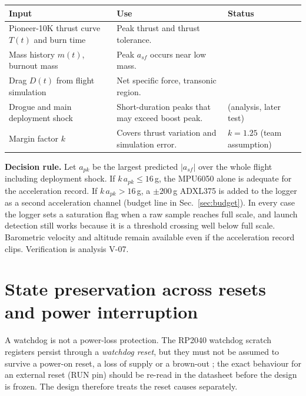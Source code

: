 \small
{}
\begin{tabularx}{\linewidth}{@{}L{42mm}Y L{34mm}@{}}
\toprule{}\textbf{Input}&\textbf{Use}&\textbf{Status}\\\midrule
Pioneer-10K thrust curve $T(t)$ and burn time & Peak thrust and thrust tolerance. & \\
Mass history $m(t)$, burnout mass & Peak $a_{sf}$ occurs near low mass. & \\
Drag $D(t)$ from flight simulation & Net specific force, transonic region. & \\
Drogue and main deployment shock & Short-duration peaks that may exceed boost peak. &  (analysis, later test)\\
Margin factor $k$ & Covers thrust variation and simulation error. & $k=1.25$ (team assumption)\\
\bottomrule
\end{tabularx}
\normalsize

\textbf{Decision rule.} Let $a_{pk}$ be the largest predicted $|a_{sf}|$ over the whole flight including deployment shock. If $k\,a_{pk}\le16$\,g, the MPU6050 alone is adequate for the acceleration record. If $k\,a_{pk}>16$\,g, a $\pm200$\,g ADXL375 \cite{adxl375ds} is added to the logger as a second acceleration channel (budget line in Sec.~\ref{sec:budget}). In every case the logger sets a saturation flag when a raw sample reaches full scale, and launch detection still works because it is a threshold crossing well below full scale. Barometric velocity and altitude remain available even if the acceleration record clips. Verification is analysis V-07.

\section{State preservation across resets and power interruption}
\label{sec:state}
A watchdog is not a power-loss protection. The RP2040 watchdog scratch registers persist through a \emph{watchdog reset}, but they must not be assumed to survive a power-on reset, a loss of supply or a brown-out \cite{rp2040ds}; the exact behaviour for an external reset (RUN pin) should be re-read in the datasheet before the design is frozen. The design therefore treats the reset causes separately.

